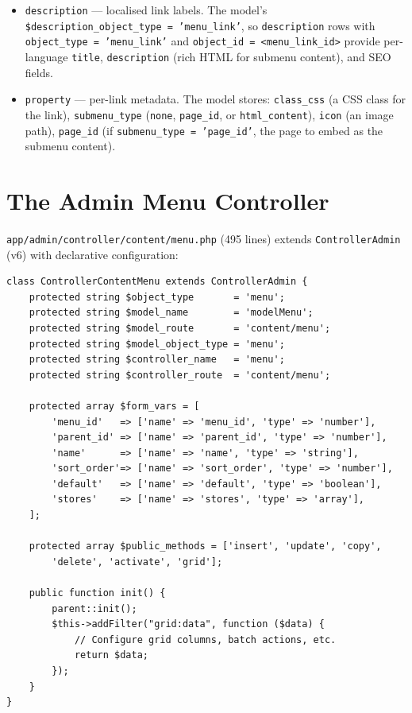 \documentclass[11pt,a4paper]{article}
\begin{document}
\begin{itemize}[leftmargin=1.6em,itemsep=2pt]
  \item \texttt{description} --- localised link labels. The model's
        \texttt{\$description\_object\_type = 'menu\_link'}, so
        \texttt{description} rows with
        \texttt{object\_type = 'menu\_link'} and
        \texttt{object\_id = <menu\_link\_id>} provide per-language
        \texttt{title}, \texttt{description} (rich HTML for submenu
        content), and SEO fields.
  \item \texttt{property} --- per-link metadata. The model stores:
        \texttt{class\_css} (a CSS class for the link),
        \texttt{submenu\_type} (\texttt{none},
        \texttt{page\_id}, or \texttt{html\_content}),
        \texttt{icon} (an image path),
        \texttt{page\_id} (if \texttt{submenu\_type = 'page\_id'},
        the page to embed as the submenu content).
\end{itemize}

\section{The Admin Menu Controller}\label{sec:admin-menu}

\texttt{app/admin/controller/content/menu.php} (495 lines) extends
\texttt{ControllerAdmin} (v6) with declarative configuration:

\begin{lstlisting}[caption={\texttt{ControllerContentMenu} --- declarative configuration.},label={lst:menu-controller}]
class ControllerContentMenu extends ControllerAdmin {
    protected string $object_type       = 'menu';
    protected string $model_name        = 'modelMenu';
    protected string $model_route       = 'content/menu';
    protected string $model_object_type = 'menu';
    protected string $controller_name   = 'menu';
    protected string $controller_route  = 'content/menu';

    protected array $form_vars = [
        'menu_id'   => ['name' => 'menu_id', 'type' => 'number'],
        'parent_id' => ['name' => 'parent_id', 'type' => 'number'],
        'name'      => ['name' => 'name', 'type' => 'string'],
        'sort_order'=> ['name' => 'sort_order', 'type' => 'number'],
        'default'   => ['name' => 'default', 'type' => 'boolean'],
        'stores'    => ['name' => 'stores', 'type' => 'array'],
    ];

    protected array $public_methods = ['insert', 'update', 'copy',
        'delete', 'activate', 'grid'];

    public function init() {
        parent::init();
        $this->addFilter("grid:data", function ($data) {
            // Configure grid columns, batch actions, etc.
            return $data;
        });
    }
}
\end{lstlisting}
\end{document}
